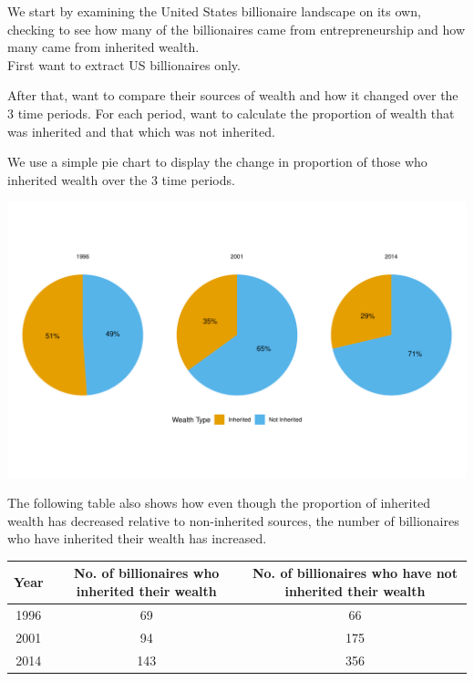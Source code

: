 \documentclass[11pt,preprint]{elsarticle}
\let\origfigure\figure
\let\endorigfigure\endfigure
\renewenvironment{figure}[1][2] {
    \expandafter\origfigure\expandafter[H]
} {
    \endorigfigure
}
\let\origtable\table
\let\endorigtable\endtable
\renewenvironment{table}[1][2] {
    \expandafter\origtable\expandafter[H]
} {
    \endorigtable
}
\numberwithin{equation}{section}
\numberwithin{figure}{section}
\numberwithin{table}{section}
\begin{document}
We start by examining the United States billionaire landscape on its
own, checking to see how many of the billionaires came from
entrepreneurship and how many came from inherited wealth.\\
First want to extract US billionaires only.

After that, want to compare their sources of wealth and how it changed
over the 3 time periods. For each period, want to calculate the
proportion of wealth that was inherited and that which was not
inherited.

We use a simple pie chart to display the change in proportion of those
who inherited wealth over the 3 time periods.

\begin{figure}[H]

{\centering \includegraphics[width=0.8\linewidth]{./output/fig1} 

}

\caption{Pie chart showing proportions of US billionaires that had inherited vs those that did not inherit their wealth \label{Fig1}}\label{fig:unnamed-chunk-2}
\end{figure}

The following table also shows how even though the proportion of
inherited wealth has decreased relative to non-inherited sources, the
number of billionaires who have inherited their wealth has increased.

\begin{table}
\centering
\caption{\label{tab:US inheritance table}Table showing the US inheritance statistics \label{tab1}}
\centering
\begin{tabular}[t]{c|c|c}
\hline
Year & No. of billionaires who inherited their wealth & No. of billionaires who have not inherited their wealth\\
\hline
1996 & 69 & 66\\
\hline
2001 & 94 & 175\\
\hline
2014 & 143 & 356\\
\hline
\end{tabular}
\end{table}
\end{document}
